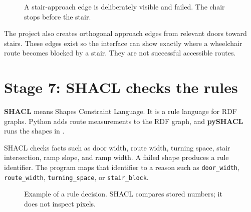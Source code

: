 \documentclass[11pt,a4paper]{article}
\newcommand{\term}[1]{\textbf{#1}}
\newcommand{\code}[1]{\texttt{#1}}
\newcommand{\stage}[1]{\par\vspace{3pt}{\color{darkteal}\bfseries\large #1}\par}
\newcommand{\door}[2]{\fill[green] (#1-0.16,#2-0.32) rectangle (#1+0.16,#2+0.32);}
\newcommand{\wheelchair}[2]{\begin{scope}[shift={(#1,#2)}]\draw[ink,line width=1.2pt] (-.25,-.18) circle (.18);\draw[ink,line width=1pt] (.26,-.2) circle (.09);\fill[blue!65!black] (-.15,.03) rectangle (.25,.25);\fill[purple!70] (-.08,.25) rectangle (.14,.47);\fill[orange!50] (.03,.58) circle (.12);\end{scope}}
\begin{document}
\begin{figure}[H]\centering
{}
\caption{A stair-approach edge is deliberately visible and failed. The chair stops before the stair.}
\end{figure}

\stage{Special blocked stair edges}
The project also creates orthogonal approach edges from relevant doors toward stairs. These edges exist so the interface can show exactly where a wheelchair route becomes blocked by a stair. They are not successful accessible routes.

\section{Stage 7: SHACL checks the rules}
\term{SHACL} means Shapes Constraint Language. It is a rule language for RDF graphs. Python adds route measurements to the RDF graph, and \term{pySHACL} runs the shapes in .

SHACL checks facts such as door width, route width, turning space, stair intersection, ramp slope, and ramp width. A failed shape produces a rule identifier. The program maps that identifier to a reason such as \code{door\_width}, \code{route\_width}, \code{turning\_space}, or \code{stair\_block}.

\begin{figure}[H]\centering
{}
\caption{Example of a rule decision. SHACL compares stored numbers; it does not inspect pixels.}
\end{figure}
\end{document}

